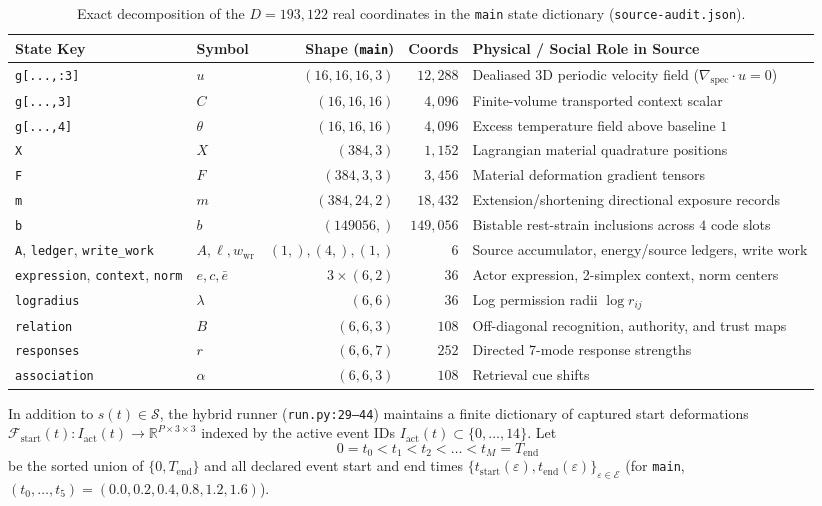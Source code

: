 \documentclass[11pt,a4paper]{article}
\theoremstyle{definition}
\begin{document}
\begin{table}[!ht]
\centering
\small
\begin{tabularx}{\textwidth}{llrr>{\raggedright\arraybackslash}X}
\toprule
\textbf{State Key} & \textbf{Symbol} & \textbf{Shape (\texttt{main})} & \textbf{Coords} & \textbf{Physical / Social Role in Source} \\
\midrule
\texttt{g[...,:3]} & $u$ & $(16,16,16,3)$ & $12,288$ & Dealiased 3D periodic velocity field ($\nabla_{\mathrm{spec}}\cdot u = 0$) \\
\texttt{g[...,3]} & $C$ & $(16,16,16)$ & $4,096$ & Finite-volume transported context scalar \\
\texttt{g[...,4]} & $\theta$ & $(16,16,16)$ & $4,096$ & Excess temperature field above baseline $1$ \\
\texttt{X} & $X$ & $(384,3)$ & $1,152$ & Lagrangian material quadrature positions \\
\texttt{F} & $F$ & $(384,3,3)$ & $3,456$ & Material deformation gradient tensors \\
\texttt{m} & $m$ & $(384,24,2)$ & $18,432$ & Extension/shortening directional exposure records \\
\texttt{b} & $b$ & $(149056,)$ & $149,056$ & Bistable rest-strain inclusions across $4$ code slots \\
\texttt{A}, \texttt{ledger}, \texttt{write\_work} & $A,\ell,w_{\mathrm{wr}}$ & $(1,), (4,), (1,)$ & $6$ & Source accumulator, energy/source ledgers, write work \\
\texttt{expression}, \texttt{context}, \texttt{norm} & $e, c, \bar{e}$ & $3 \times (6,2)$ & $36$ & Actor expression, 2-simplex context, norm centers \\
\texttt{logradius} & $\lambda$ & $(6,6)$ & $36$ & Log permission radii $\log r_{ij}$ \\
\texttt{relation} & $B$ & $(6,6,3)$ & $108$ & Off-diagonal recognition, authority, and trust maps \\
\texttt{responses} & $r$ & $(6,6,7)$ & $252$ & Directed 7-mode response strengths \\
\texttt{association} & $\alpha$ & $(6,6,3)$ & $108$ & Retrieval cue shifts \\
\bottomrule
\end{tabularx}
\caption{Exact decomposition of the $D = 193,122$ real coordinates in the \texttt{main} state dictionary (\texttt{source-audit.json}).}
\end{table}

In addition to $s(t) \in \mathcal{S}$, the hybrid runner (\texttt{run.py:29--44}) maintains a finite dictionary of captured start deformations $\mathcal{F}_{\mathrm{start}}(t) : I_{\mathrm{act}}(t) \to \mathbb{R}^{P \times 3 \times 3}$ indexed by the active event IDs $I_{\mathrm{act}}(t) \subset \{0, \dots, 14\}$. Let
\begin{equation}
  0 = t_0 < t_1 < t_2 < \dots < t_M = T_{\mathrm{end}}
\end{equation}
be the sorted union of $\{0, T_{\mathrm{end}}\}$ and all declared event start and end times $\{t_{\mathrm{start}}(\varepsilon), t_{\mathrm{end}}(\varepsilon)\}_{\varepsilon \in \mathcal{E}}$ (for \texttt{main}, $(t_0, \dots, t_5) = (0.0, 0.2, 0.4, 0.8, 1.2, 1.6)$).
\end{document}
